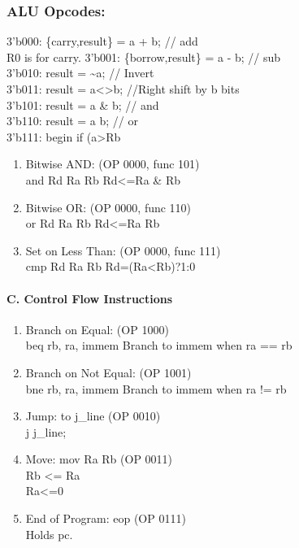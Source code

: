 \documentclass[11pt]{article}
\begin{document}
\subsubsection{ALU Opcodes:}\label{alu-opcodes}

3'b000: \{carry,result\} = a + b; // add\\
R0 is for carry. 3'b001: \{borrow,result\} = a - b; // sub\\
3'b010: result = \textasciitilde{}a; // Invert\\
3'b011: result = a\textless{}\textgreater{}b; //Right shift by b bits\\
3'b101: result = a \& b; // and\\
3'b110: result = a \textbar{} b; // or\\
3'b111: begin if (a\textgreater{}Rb

\begin{enumerate}
\def\labelenumi{\arabic{enumi}.}
\setcounter{enumi}{5}
\item
  Bitwise AND: (OP 0000, func 101)\\
  and Rd Ra Rb Rd\textless{}=Ra \& Rb
\item
  Bitwise OR: (OP 0000, func 110)\\
  or Rd Ra Rb Rd\textless{}=Ra \textbar{}\textbar{} Rb
\item
  Set on Less Than: (OP 0000, func 111)\\
  cmp Rd Ra Rb Rd=(Ra\textless{}Rb)?1:0
\end{enumerate}

\paragraph{C. Control Flow
Instructions}\label{c.-control-flow-instructions}

\begin{enumerate}
\def\labelenumi{\arabic{enumi}.}
\item
  Branch on Equal: (OP 1000)\\
  beq rb, ra, immem Branch to immem when ra == rb
\item
  Branch on Not Equal: (OP 1001)\\
  bne rb, ra, immem Branch to immem when ra != rb
\item
  Jump: to j\_line (OP 0010)\\
  j j\_line;
\item
  Move: mov Ra Rb (OP 0011)\\
  Rb \textless{}= Ra\\
  Ra\textless{}=0
\item
  End of Program: eop (OP 0111)\\
  Holds pc.
\end{enumerate}
\end{document}
